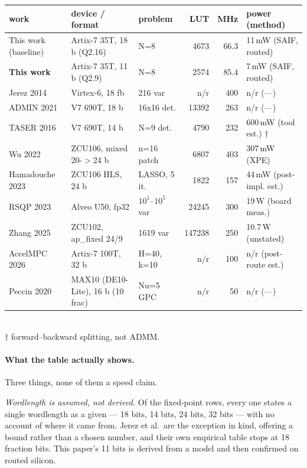 \documentclass[11pt,a4paper]{article}
\begin{document}
\begin{center}\scriptsize\setlength{\tabcolsep}{3.5pt}
\begin{tabular}{lllrrl}
\toprule
work & device / format & problem & LUT & MHz & power (method) \\
\midrule
This work (baseline) & Artix-7 35T, 18 b (Q2.16) & N=8 & 4673 & 66.3 & 11\,mW (SAIF, routed) \\
\textbf{This work} & Artix-7 35T, 11 b (Q2.9) & N=8 & 2574 & 85.4 & 7\,mW (SAIF, routed) \\
\midrule
Jerez 2014 & Virtex-6, 18 fb & 216 var & n/r & 400 & n/r (---) \\
ADMIN 2021 & V7 690T, 18 b & 16x16 det. & 13392 & 263 & n/r (---) \\
TASER 2016 & V7 690T, 14 b & N=9 det. & 4790 & 232 & 600\,mW (tool est.) $\dagger$ \\
Wu 2022 & ZCU106, mixed 20-$>$24 b & n=16 patch & 6807 & 403 & 307\,mW (XPE) \\
Hamadouche 2023 & ZCU106 HLS, 24 b & LASSO, 5 it. & 1822 & 157 & 44\,mW (post-impl. est.) \\
RSQP 2023 & Alveo U50, fp32 & $10^1$--$10^5$ var & 24245 & 300 & 19\,W (board meas.) \\
Zhang 2025 & ZCU102, ap\_fixed 24/9 & 1619 var & 147238 & 250 & 10.7\,W (unstated) \\
AccelMPC 2026 & Artix-7 100T, 32 b & H=40, k=10 & n/r & 100 & n/r (post-route est.) \\
Peccin 2020 & MAX10 (DE10-Lite), 16 b (10 frac) & Nu=5 GPC & n/r & 50 & n/r (---) \\
\bottomrule
\end{tabular}
\\[2pt]\footnotesize $\dagger$ forward--backward splitting, not ADMM.
\end{center}

\paragraph{What the table actually shows.} Three things, none of them a
speed claim.

\emph{Wordlength is assumed, not derived.} Of the fixed-point rows, every one
states a single wordlength as a given --- 18 bits, 14 bits, 24 bits, 32 bits
--- with no account of where it came from. Jerez et al.\ are the exception in
kind, offering a bound rather than a chosen number, and their own empirical
table stops at 18 fraction bits. This paper's 11 bits is derived from a model
and then confirmed on routed silicon.
\end{document}
